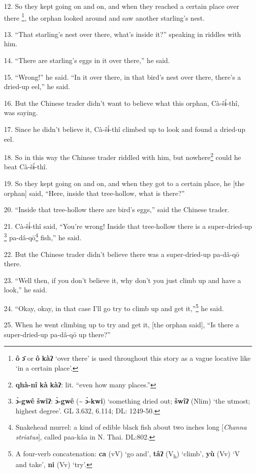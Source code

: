 12. So they kept going on and on, and when they reached a certain place over there
\footnote{\textbf{ô} \textbf{ɔ̄} or \textbf{ô} \textbf{kàʔ} `over there' is used throughout this story as a vague locative like `in a certain place'.}, the orphan looked around and saw another starling's nest.

13. ``That starling's nest over there, what's inside it?'' speaking in riddles
with him.

14. ``There are starling's eggs in it over there,'' he said.

15. ``Wrong!'' he said. ``In it over there, in that bird's nest over there, there's
a dried-up eel,'' he said.

16. But the Chinese trader didn't want to believe what this orphan, Cà-šɨ́-thî,
was saying.

17. Since he didn't believe it, Cà-šɨ́-thî climbed up to look and found a
dried-up eel.

18. So in this way the Chinese trader riddled with him, but nowhere\footnote{\textbf{qhà-nî} \textbf{kà} \textbf{kàʔ}: lit. ``even how many places.''} could he
beat Cà-šɨ́-thî.

19. So they kept going on and on, and when they got to a certain place, he [the
orphan] said, ``Here, inside that tree-hollow, what is there?''

20. ``Inside that tree-hollow there are bird's eggs,'' said the Chinese trader.

21. Cà-šɨ́-thî said, ``You're wrong! Inside that tree-hollow there is a super-dried-up
\footnote{\textbf{ɔ̀-gwê} \textbf{šwîʔ}: \textbf{ɔ̀-gwê} (\textasciitilde{} \textbf{ɔ̀-kwi}) `something dried out; \textbf{šwîʔ} (Nlim) `the utmost; highest degree'. GL 3.632, 6.114; DL: 1249-50.} pa-dâ-qō\footnote{Snakehead murrel: a kind of edible black fish about two inches long [\textit{Channa striatus}], called paa-kâa in N. Thai. DL:802.} fish,'' he said.

22. But the Chinese trader didn't believe there was a super-dried-up pa-dâ-qō
there.

23. ``Well then, if you don't believe it, why don't you just climb up and have
a look,'' he said.

24. ``Okay, okay, in that case I'll go try to climb up and get it,''\footnote{A four-verb concatenation: \textbf{ca} (vV) `go and', \textbf{tâʔ} (V\textsubscript{h}) `climb', \textbf{yù} (Vv) `V and take', \textbf{ni} (Vv) `try'.} he said.

25. When he went climbing up to try and get it, [the orphan said], ``Is there a
super-dried-up pa-dâ-qō up there?''

